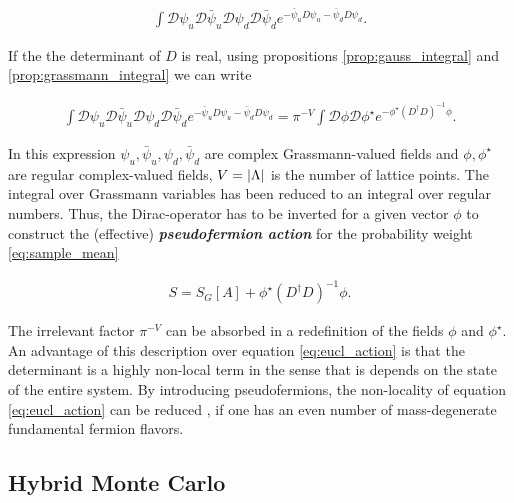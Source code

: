 \documentclass{article}
\theoremstyle{plain} %
\theoremstyle{convention} %
\theoremstyle{remark} %
\def\df#1{\textbf{\textit{#1}}}
\numberwithin{equation}{section}
\begin{document}
\begin{align*}
\int \mathcal{D}\psi_u \mathcal{D} \bar{\psi}_u \mathcal{D}\psi_d \mathcal{D} \bar{\psi}_d e^{ - \bar{\psi}_u D \psi_u - \bar{\psi}_d D \psi_d }.
\end{align*}

If the the determinant of $D$ is real, using propositions \ref{prop:gauss_integral} and \ref{prop:grassmann_integral} we can write

\begin{align*}
  \int \mathcal{D}\psi_u \mathcal{D} \bar{\psi}_u \mathcal{D}\psi_d \mathcal{D} \bar{\psi}_d e^{ - \bar{\psi}_u D \psi_u - \bar{\psi}_d D \psi_d } = \pi^{-V} \int \mathcal{D}\phi \mathcal{D} \phi^{\star} e^{ - \phi^{\star} (D^{\dagger}D)^{-1} \phi }.
\end{align*}

In this expression $\psi_u, \bar{\psi}_u, \psi_d, \bar{\psi}_d$ are complex Grassmann-valued fields and $\phi, \phi^{\star}$ are regular complex-valued fields, $V = \abs{\Lambda}$ is the number of lattice points. The integral over Grassmann variables has been reduced to an integral over regular numbers. Thus, the Dirac-operator has to be inverted for a given vector $\phi$ to construct the (effective) \df{pseudofermion action} for the probability weight \eqref{eq:sample_mean}

\begin{align}
  S = S_G[A] + \phi^{\star} (D^{\dagger}D)^{-1} \phi. \label{eq:pseudofermion_action}
\end{align}

The irrelevant factor $\pi^{-V}$ can be absorbed in a redefinition of the fields $\phi$ and $\phi^{\star}$. An advantage of this description over equation \eqref{eq:eucl_action} is that the determinant is a highly non-local term in the sense that is depends on the state of the entire system. By introducing pseudofermions, the non-locality of equation \eqref{eq:eucl_action} can be reduced \cite{fucito1981}, if one has an even number of mass-degenerate fundamental fermion flavors.

\subsection{Hybrid Monte Carlo}
\end{document}
